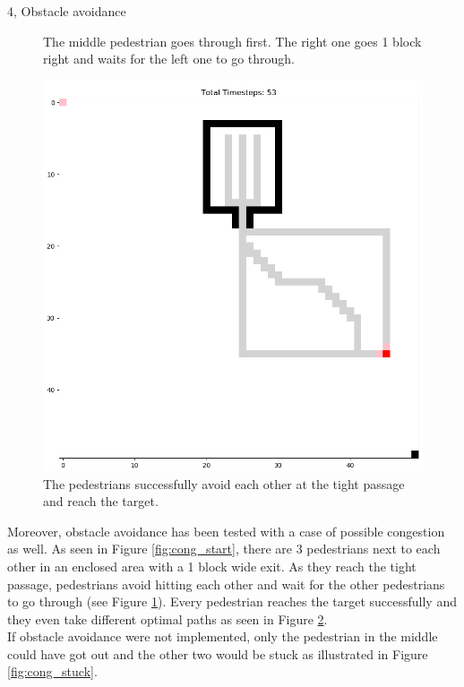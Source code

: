 \documentclass[10pt,a4paper]{article}
\begin{document}
\begin{task}{4, Obstacle avoidance}
\begin{figure}[h!]
    \caption{The middle pedestrian goes through first. The right one goes 1 block right and waits for the left one to go through.}
    \label{fig:cong_mid}
\end{figure}
\begin{figure}[h!]
    \centering
    \includegraphics[width=\textwidth]{pictures/end_task4_cong.PNG}
    \caption{The pedestrians successfully avoid each other at the tight passage and reach the target.}
    \label{fig:cong_end}
\end{figure}
Moreover, obstacle avoidance has been tested with a case of possible congestion as well. As seen in Figure \ref{fig:cong_start}, there are 3 pedestrians next to each other in an enclosed area with a 1 block wide exit. As they reach the tight passage, pedestrians avoid hitting each other and wait for the other pedestrians to go through (see Figure \ref{fig:cong_mid}). Every pedestrian reaches the target successfully and they even take different optimal paths as seen in Figure \ref{fig:cong_end}. \\
If obstacle avoidance were not implemented, only the pedestrian in the middle could have got out and the other two would be stuck as illustrated in Figure \ref{fig:cong_stuck}. \\
\begin{figure}[h!]

\end{figure}
\end{task}
\end{document}
